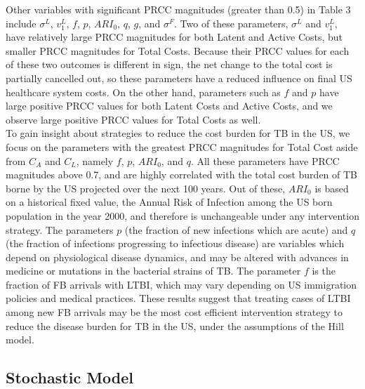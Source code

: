 \documentclass{amsart}
\begin{document}
Other variables with significant PRCC magnitudes (greater than 0.5) in Table 3 include $\sigma^{L}$, $v^{L}_{1}$, $f$, $p$, $ARI_{0}$, $q$, $g$, and $\sigma^{F}$.  Two of these parameters, $\sigma^{L}$ and $v^{L}_{1}$, have relatively large PRCC magnitudes for both Latent and Active Costs, but smaller PRCC magnitudes for Total Costs.  Because their PRCC values for each of these two outcomes is different in sign, the net change to the total cost is partially cancelled out, so these parameters have a reduced influence on final US healthcare system costs.  On the other hand, parameters such as $f$ and $p$ have large positive PRCC values for both Latent Costs and Active Costs, and we observe large positive PRCC values for Total Costs as well.\\

To gain insight about strategies to reduce the cost burden for TB in the US, we focus on the parameters with the greatest PRCC magnitudes for Total Cost aside from $C_{A}$ and $C_{L}$, namely $f$, $p$, $ARI_{0}$, and $q$.  All these parameters have PRCC magnitudes above 0.7, and are highly correlated with the total cost burden of TB borne by the US projected over the next 100 years.  Out of these, $ARI_{0}$ is based on a historical fixed value, the Annual Risk of Infection among the US born population in the year 2000, and therefore is unchangeable under any intervention strategy.  The parameters $p$ (the fraction of new infections which are acute) and $q$ (the fraction of infections progressing to infectious disease) are variables which depend on physiological disease dynamics, and may be altered with advances in medicine or mutations in the bacterial strains of TB.  The parameter $f$ is the fraction of FB arrivals with LTBI, which may vary depending on US immigration policies and medical practices.  These results suggest that treating cases of LTBI among new FB arrivals may be the most cost efficient intervention strategy to reduce the disease burden for TB in the US, under the assumptions of the Hill model.  \\

\subsection{Stochastic Model}
\end{document}
